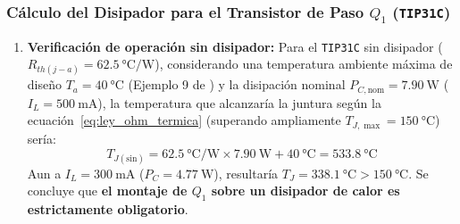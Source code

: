 \subsubsection{Cálculo del Disipador para el Transistor de Paso $Q_1$ (\texttt{TIP31C})}
\begin{enumerate}
    \item \textbf{Verificación de operación sin disipador:} Para el \texttt{TIP31C} sin disipador ($R_{th(j-a)} = \SI{62,5}{\celsius\per\watt}$), considerando una temperatura ambiente máxima de diseño $T_a = \SI{40}{\celsius}$ (Ejemplo 9 de \cite{gonzalez_p2}) y la disipación nominal $P_{C,\text{nom}} = \SI{7,90}{\watt}$ ($I_L = \SI{500}{\milli\ampere}$), la temperatura que alcanzaría la juntura según la ecuación~\eqref{eq:ley_ohm_termica} (superando ampliamente $T_{J,\max} = \SI{150}{\celsius}$) sería:
    \begin{equation}
        T_{J(\text{sin})} = \SI{62,5}{\celsius\per\watt} \times \SI{7,90}{\watt} + \SI{40}{\celsius} = \SI{533,8}{\celsius}
        \label{eq:tj_sin_disip_q1}
    \end{equation}
    Aun a $I_L = \SI{300}{\milli\ampere}$ ($P_C = \SI{4,77}{\watt}$), resultaría $T_J = \SI{338,1}{\celsius} > \SI{150}{\celsius}$. Se concluye que \textbf{el montaje de $Q_1$ sobre un disipador de calor es estrictamente obligatorio}.


\end{enumerate}
